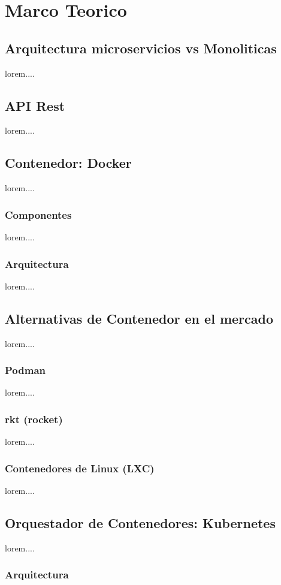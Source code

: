 \chapter{Marco Teorico}

  \section{Arquitectura microservicios vs Monoliticas}

lorem....



  \section{API Rest}


lorem....

  \section{Contenedor: Docker}

lorem....

  \subsection{Componentes}
  
lorem....

  \subsection{Arquitectura}
  
lorem....

  \section{Alternativas de Contenedor en el mercado}
  
lorem....

  \subsection{Podman}
  
lorem....

  \subsection{rkt (rocket)}
  
lorem....

  \subsection{Contenedores de Linux (LXC)}
  
lorem....


  \section{Orquestador de Contenedores: Kubernetes}
  
lorem....

  \subsection{Arquitectura}




